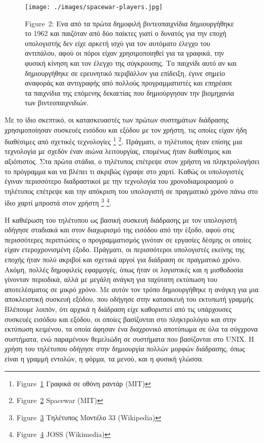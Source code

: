 \documentclass[
]{article}
\begin{document}
\leavevmode{}%
\begin{figure}
\hypertarget{fig:spacewar-players}{%
\centering
\texttt{[image: ./images/spacewar-players.jpg]}
\caption{Figure~2: Ενα από τα πρώτα δημοφιλή βιντεοπαιχνίδια
δημιουργήθηκε το 1962 και παιζόταν από δύο παίκτες γιατί ο δυνατός για
την εποχή υπολογιστής δεν είχε αρκετή ισχύ για τον αυτόματο έλεγχο του
αντιπάλου, αφού οι πόροι είχαν χρησιμοποιηθεί για τα γραφικά, την φυσική
κίνηση και τον έλεγχο της σύγκρουσης. Το παιχνίδι αυτό αν και
δημιουργήθηκε σε ερευνητικό περιβάλλον για επίδειξη, έγινε σημείο
αναφοράς και αντιγραφής από πολλούς προγραμματιστές και επηρέασε τα
παιχνίδια της επόμενης δεκαετίας που δημιούργησαν την βιομηχανία των
βιντεοπαιχνιδιών.}\label{fig:spacewar-players}
}
\end{figure}

Με το ίδιο σκεπτικό, οι κατασκευαστές των πρώτων συστημάτων διάδρασης
χρησιμοποίησαν συσκευές εισόδου και εξόδου με τον χρήστη, τις οποίες
είχαν ήδη διαθέσιμες από σχετικές τεχνολογίες \footnote{Figure~\protect\hyperlink{fig:sage-radar}{1}
  Γραφικά σε οθόνη ραντάρ (MIT)} \footnote{Figure~\protect\hyperlink{fig:spacewar-players}{2}
  Spacewar (MIT)}. Πράγματι, ο τηλέτυπος ήταν επίσης μια τεχνολογία με
σχεδόν έναν αιώνα λειτουργίας, επομένως ήταν διαθέσιμος και αξιόπιστος.
Στα πρώτα στάδια, ο τηλέτυπος επέτρεψε στον χρήστη να πληκτρολογήσει το
πρόγραμμα και να βλέπει τι ακριβώς έγραψε στο χαρτί. Καθώς οι
υπολογιστές έγιναν περισσότερο διαδραστικοί με την τεχνολογία του
χρονοδιαμοιρασμού ο τηλέτυπος επέτρεψε και την απόκριση του υπολογιστή
σε πραγματικό χρόνο πάνω στο ίδιο χαρτί μπροστά στον χρήστη \footnote{Figure~\protect\hyperlink{fig:tty-model33}{3}
  Τηλέτυπος Μοντέλο 33 (Wikipedia)} \footnote{Figure~\protect\hyperlink{fig:joss}{4}
  JOSS (Wikimedia)}.

Η καθιέρωση του τηλέτυπου ως βασική συσκευή διάδρασης με τον υπολογιστή
οδήγησε σταδιακά και στον διαχωρισμό της εισόδου από την έξοδο, αφού
στις περισσότερες περιπτώσεις ο προγραμματισμός γινόταν σε εργασίες
δέσμης οι οποίες είχαν ετεροχρονισμένη έξοδο. Πράγματι, οι περισσότεροι
υπολογιστές εκείνης της εποχής ήταν πολύ ακριβοί και σχετικά αργοί για
διάδραση σε πραγματικό χρόνο. Ακόμη, πολλές δημοφιλείς εφαρμογές, όπως
ήταν οι λογιστικές και η μισθοδοσία γίνονταν περιοδικά, αλλά με μεγάλη
ανάγκη για ταχύτατη εκτύπωση του αποτελέσματος σε μικρό χρόνο. Με αυτόν
τον τρόπο δημιουργήθηκε η ανάγκη για μια αποκλειστική συσκευή εξόδου,
που οδήγησε στην κατασκευή του εκτυπωτή γραμμής Βλέπουμε λοιπόν, ότι
αρχικά η διάδραση είχε καθοριστεί από τις υπάρχουσες συσκευές εισόδου
και εξόδου, οι οποίες βασίζονται στο πληκτρολόγιο και στην εκτύπωση
κειμένου, τα οποία άφησαν ένα διαχρονικό αποτύπωμα σε όλα τα σύγχρονα
συστήματα, ενώ παραμένουν θεμελιώδη σε συστήματα που βασίζονται στο
UNIX. Η χρήση του τηλέτυπου οδήγησε στην δημιουργία πολλών μορφών
διάδρασης, όπως είναι η γραμμή εντολών, η φόρμα, τα μενού, και η φυσική
γλώσσα.
\end{document}
